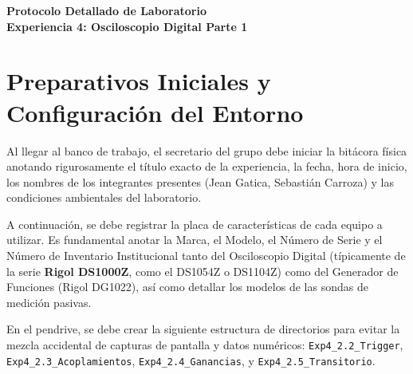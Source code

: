 \documentclass[12pt, letterpaper]{article}
\begin{document}
\begin{center}
    \LARGE \textbf{Protocolo Detallado de Laboratorio}\\
    \large \textbf{Experiencia 4: Osciloscopio Digital Parte 1}
\end{center}
\vspace{0.5cm}

\section{Preparativos Iniciales y Configuración del Entorno}

Al llegar al banco de trabajo, el secretario del grupo debe iniciar la bitácora física anotando rigurosamente el título exacto de la experiencia, la fecha, hora de inicio, los nombres de los integrantes presentes (Jean Gatica, Sebastián Carroza) y las condiciones ambientales del laboratorio. 

A continuación, se debe registrar la placa de características de cada equipo a utilizar. Es fundamental anotar la Marca, el Modelo, el Número de Serie y el Número de Inventario Institucional tanto del Osciloscopio Digital (típicamente de la serie \textbf{Rigol DS1000Z}, como el DS1054Z o DS1104Z) como del Generador de Funciones (Rigol DG1022), así como detallar los modelos de las sondas de medición pasivas.

En el pendrive, se debe crear la siguiente estructura de directorios para evitar la mezcla accidental de capturas de pantalla y datos numéricos: \texttt{Exp4\_2.2\_Trigger}, \texttt{Exp4\_2.3\_Acoplamientos}, \texttt{Exp4\_2.4\_Ganancias}, y \texttt{Exp4\_2.5\_Transitorio}.
\end{document}
